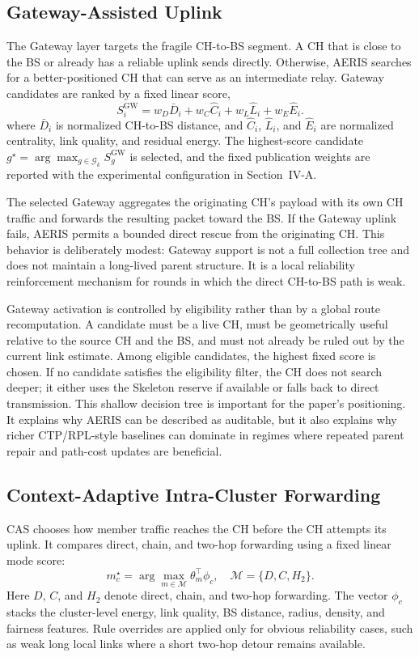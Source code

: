 \documentclass[conference]{IEEEtran}
\begin{document}
\subsection{Gateway-Assisted Uplink}
The Gateway layer targets the fragile CH-to-BS segment. A CH that is close to the BS or already has a reliable uplink sends directly. Otherwise, AERIS searches for a better-positioned CH that can serve as an intermediate relay. Gateway candidates are ranked by a fixed linear score,
\begin{equation}
S_i^{\mathrm{GW}}=w_D\bar{D}_i+w_C\hat{C}_i+w_L\hat{L}_i+w_E\hat{E}_i .
\end{equation}
where $\bar{D}_i$ is normalized CH-to-BS distance, and $\hat{C}_i$, $\hat{L}_i$, and $\hat{E}_i$ are normalized centrality, link quality, and residual energy. The highest-score candidate $g^\star=\arg\max_{g\in\mathcal{G}_k}S_g^{\mathrm{GW}}$ is selected, and the fixed publication weights are reported with the experimental configuration in Section~IV-A.

The selected Gateway aggregates the originating CH's payload with its own CH traffic and forwards the resulting packet toward the BS. If the Gateway uplink fails, AERIS permits a bounded direct rescue from the originating CH. This behavior is deliberately modest: Gateway support is not a full collection tree and does not maintain a long-lived parent structure. It is a local reliability reinforcement mechanism for rounds in which the direct CH-to-BS path is weak.

Gateway activation is controlled by eligibility rather than by a global route recomputation. A candidate must be a live CH, must be geometrically useful relative to the source CH and the BS, and must not already be ruled out by the current link estimate. Among eligible candidates, the highest fixed score is chosen. If no candidate satisfies the eligibility filter, the CH does not search deeper; it either uses the Skeleton reserve if available or falls back to direct transmission. This shallow decision tree is important for the paper's positioning. It explains why AERIS can be described as auditable, but it also explains why richer CTP/RPL-style baselines can dominate in regimes where repeated parent repair and path-cost updates are beneficial.

\subsection{Context-Adaptive Intra-Cluster Forwarding}
CAS chooses how member traffic reaches the CH before the CH attempts its uplink. It compares direct, chain, and two-hop forwarding using a fixed linear mode score:
\begin{equation}
m_c^{\star}=\arg\max_{m\in\mathcal{M}}\theta_m^\top\phi_c,\quad \mathcal{M}=\{D,C,H_2\}.
\end{equation}
Here $D$, $C$, and $H_2$ denote direct, chain, and two-hop forwarding. The vector $\phi_c$ stacks the cluster-level energy, link quality, BS distance, radius, density, and fairness features. Rule overrides are applied only for obvious reliability cases, such as weak long local links where a short two-hop detour remains available.
\end{document}
